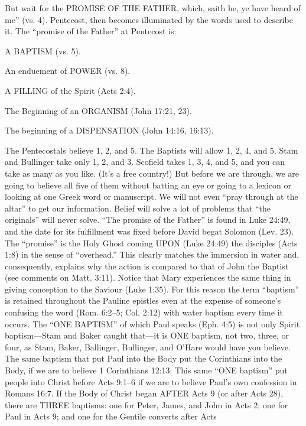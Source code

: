 But wait for the PROMISE OF THE FATHER, which, saith he, ye have heard of me” (vs. 4). Pentecost, then becomes illuminated by the words used to describe it. The “promise of the Father” at Pentecost is:
\begin{compactenum}
	\item A BAPTISM (vs. 5).
	\item An enduement of POWER (vs. 8).
	\item A FILLING of the Spirit (Acts 2:4).
	\item The Beginning of an ORGANISM (John 17:21, 23).
	\item The beginning of a DISPENSATION (John 14:16, 16:13).
\end{compactenum}
The Pentecostals believe 1, 2, and 5. The Baptists will allow 1, 2, 4, and 5. Stam and Bullinger
take only 1, 2, and 3. Scofield takes 1, 3, 4, and 5, and you can take as many as you like. (It’s a free
country!) But before we are through, we are going to believe all five of them without batting an eye or
going to a lexicon or looking at one Greek word or manuscript. We will not even “pray through at the
altar” to get our information. Belief will solve a lot of problems that “the originals” will never solve.
“The promise of the Father” is found in Luke 24:49, and the date for its fulfillment was fixed
before David begat Solomon (Lev. 23). The “promise” is the Holy Ghost coming UPON (Luke
24:49) the disciples (Acts 1:8) in the sense of “overhead.” This clearly matches the immersion in
water and, consequently, explains why the action is compared to that of John the Baptist (see
comments on Matt. 3:11). Notice that Mary experiences the same thing in giving conception to the
Saviour (Luke 1:35). For this reason the term “baptism” is retained throughout the Pauline
epistles even at the expense of someone’s confusing the word (Rom. 6:2–5; Col. 2:12) with water
baptism every time it occurs. The “ONE BAPTISM” of which Paul speaks (Eph. 4:5) is not only
Spirit baptism—Stam and Baker caught that—it is ONE baptism, not two, three, or four, as Stam,
Baker, Ballinger, Bullinger, and O’Hare would have you believe. The same baptism that put Paul into
the Body put the Corinthians into the Body, if we are to believe 1 Corinthians 12:13: This same
“ONE baptism” put people into Christ before Acts 9:1–6 if we are to believe Paul’s own confession
in Romans 16:7.
If the Body of Christ began AFTER Acts 9 (or after Acts 28), there are THREE baptisms: one for
Peter, James, and John in Acts 2; one for Paul in Acts 9; and one for the Gentile converts after Acts
